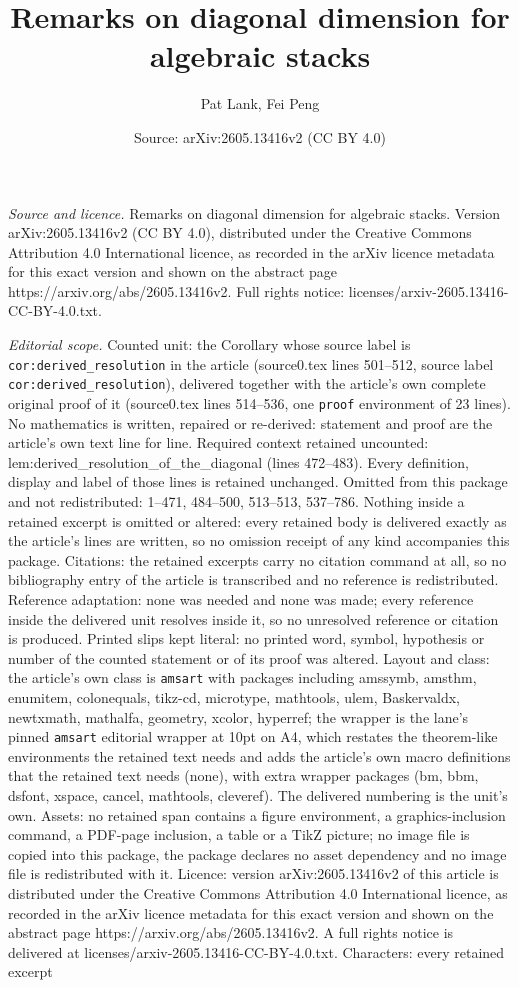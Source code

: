 \documentclass[10pt,a4paper]{amsart}
\title[Remarks on diagonal dimension for algebraic stacks]{Remarks on diagonal dimension for algebraic stacks}
\author{Pat Lank, Fei Peng}
\date{Source: arXiv:2605.13416v2 (CC BY 4.0)}
\begin{document}
\maketitle

\noindent\emph{Source and licence.} Remarks on diagonal dimension for algebraic stacks. Version arXiv:2605.13416v2 (CC BY 4.0), distributed under the Creative Commons Attribution 4.0 International licence, as recorded in the arXiv licence metadata for this exact version and shown on the abstract page https://arxiv.org/abs/2605.13416v2. Full rights notice: licenses/arxiv-2605.13416-CC-BY-4.0.txt.\par\smallskip

\noindent\textit{Editorial scope.} Counted unit: the Corollary whose source label is \texttt{cor:derived\_resolution} in the article (source0.tex lines 501--512, source label \texttt{cor:derived\_resolution}), delivered together with the article's own complete original proof of it (source0.tex lines 514--536, one \texttt{proof} environment of 23 lines). No mathematics is written, repaired or re-derived: statement and proof are the article's own text line for line. Required context retained uncounted: lem:derived\_resolution\_of\_the\_diagonal (lines 472--483). Every definition, display and label of those lines is retained unchanged. Omitted from this package and not redistributed: 1--471, 484--500, 513--513, 537--786. Nothing inside a retained excerpt is omitted or altered: every retained body is delivered exactly as the article's lines are written, so no omission receipt of any kind accompanies this package. Citations: the retained excerpts carry no citation command at all, so no bibliography entry of the article is transcribed and no reference is redistributed. Reference adaptation: none was needed and none was made; every reference inside the delivered unit resolves inside it, so no unresolved reference or citation is produced. Printed slips kept literal: no printed word, symbol, hypothesis or number of the counted statement or of its proof was altered. Layout and class: the article's own class is \texttt{amsart} with packages including amssymb, amsthm, enumitem, colonequals, tikz-cd, microtype, mathtools, ulem, Baskervaldx, newtxmath, mathalfa, geometry, xcolor, hyperref; the wrapper is the lane's pinned \texttt{amsart} editorial wrapper at 10pt on A4, which restates the theorem-like environments the retained text needs and adds the article's own macro definitions that the retained text needs (none), with extra wrapper packages (bm, bbm, dsfont, xspace, cancel, mathtools, cleveref). The delivered numbering is the unit's own. Assets: no retained span contains a figure environment, a graphics-inclusion command, a PDF-page inclusion, a table or a TikZ picture; no image file is copied into this package, the package declares no asset dependency and no image file is redistributed with it. Licence: version arXiv:2605.13416v2 of this article is distributed under the Creative Commons Attribution 4.0 International licence, as recorded in the arXiv licence metadata for this exact version and shown on the abstract page https://arxiv.org/abs/2605.13416v2. A full rights notice is delivered at licenses/arxiv-2605.13416-CC-BY-4.0.txt. Characters: every retained excerpt 
\end{document}
